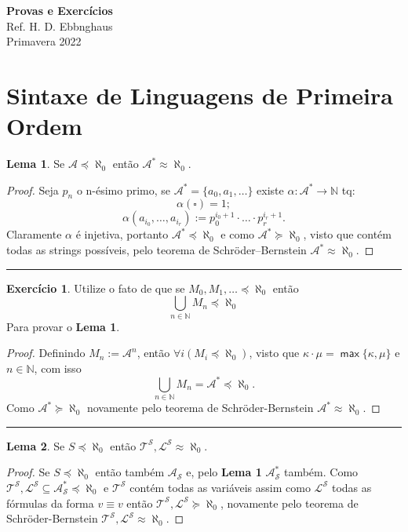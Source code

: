 \documentclass[11pt]{article}
\theoremstyle{definition}
\newtheorem{exer}{Exercício}
\newtheorem{lemma}{Lema}
\newcommand{\mc}[1]{\mathcal{#1}}
\newcommand{\msf}[1]{\mathsf{#1}}
\newcommand{\mbb}[1]{\mathbb{#1}}
\begin{document}
\setcounter{section}{0}
\thispagestyle{empty}

\begin{center}
{\LARGE \bf Provas e Exercícios}\\
{\large Ref. H. D. Ebbnghaus}\\
Primavera 2022
\end{center}

\tableofcontents

\section{Sintaxe de Linguagens de Primeira Ordem}

\begin{lemma}
Se $\mc{A}\preceq\aleph_0$ então $\mc{A}^*\approx\aleph_0$.

\begin{proof}
Seja $p_n$ o n-ésimo primo, se $\mc{A}^*=\{a_0,a_1,\dots\}$ existe $\alpha:\mc{A}^*\to\mbb{N}$ tq:
\[
\alpha(\square)=1;
\]
\[
\alpha(a_{i_0},\dots,a_{i_r}):=p_0^{i_0+1}\cdot\dots\cdot p_r^{i_r+1}.
\]
Claramente $\alpha$ é injetiva, portanto $\mc{A}^*\preceq\aleph_0$ e como $\mc{A}^*\succeq\aleph_0$, visto que contém todas as strings possíveis, pelo teorema de Schröder–Bernstein $\mc{A}^*\approx\aleph_0$.
\end{proof}
\end{lemma}

\hrule

\begin{exer}
Utilize o fato de que se $M_0,M_1,\dots\preceq\aleph_0$ então
\[
\bigcup_{n\in\mbb{N}}M_n\preceq\aleph_0
\]
Para provar o \textbf{Lema 1}.
\begin{proof}
Definindo $M_n:=\mc{A}^n$, então $\forall i(M_i\preceq\aleph_0)$, visto que $\kappa\cdot\mu=\msf{\max}\{\kappa,\mu\}$ e $n\in\mbb{N}$, com isso
\[
\bigcup_{n\in\mbb{N}}M_n=\mc{A}^*\preceq\aleph_0.
\]
Como $\mc{A}^*\succeq\aleph_0$ novamente pelo teorema de Schröder-Bernstein $\mc{A}^*\approx\aleph_0$.
\end{proof}
\end{exer}

\hrule

\begin{lemma}
Se $S\preceq\aleph_0$ então $\mc{T}^\mc{S},\mc{L}^\mc{S}\approx\aleph_0$.
\begin{proof}
Se $S\preceq\aleph_0$ então também $\mc{A}_\mc{S}$ e, pelo \textbf{Lema 1} $\mc{A}_\mc{S}^*$ também. Como $\mc{T}^\mc{S},\mc{L}^\mc{S}\subseteq\mc{A}_\mc{S}^*\preceq\aleph_0$ e $\mc{T}^\mc{S}$ contém todas as variáveis assim como $\mc{L}^\mc{S}$ todas as fórmulas da forma $v\equiv v$ então $\mc{T}^\mc{S},\mc{L}^\mc{S}\succeq\aleph_0$, novamente pelo teorema de Schröder-Bernstein $\mc{T}^\mc{S},\mc{L}^\mc{S}\approx\aleph_0$.
\end{proof}
\end{lemma}
\end{document}
